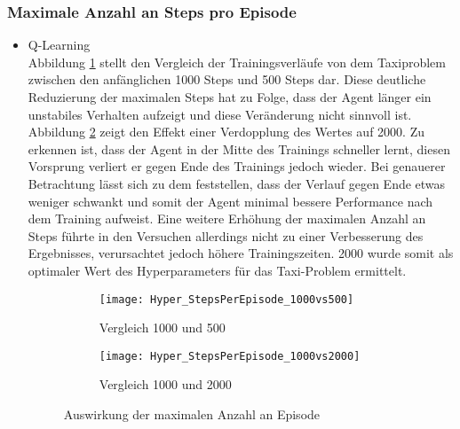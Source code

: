 \subsubsection{Maximale Anzahl an Steps pro Episode}
\begin{itemize}
    \item Q-Learning\\
    Abbildung \ref{fig:MaxStepCount_1000vs500} stellt den Vergleich der Trainingsverläufe von dem Taxiproblem zwischen den anfänglichen 1000 Steps und 500 Steps dar.
    Diese deutliche Reduzierung der maximalen Steps hat zu Folge, dass der Agent länger ein unstabiles Verhalten aufzeigt und diese Veränderung nicht sinnvoll ist.
    Abbildung \ref{fig:MaxStepCount_1000vs2000} zeigt den Effekt einer Verdopplung des Wertes auf 2000. Zu erkennen ist, dass der Agent in der Mitte des Trainings schneller lernt, diesen Vorsprung verliert er gegen Ende des Trainings jedoch wieder.
    Bei genauerer Betrachtung lässt sich zu dem feststellen, dass der Verlauf gegen Ende etwas weniger schwankt und somit der Agent minimal bessere Performance nach dem Training aufweist. 
    Eine weitere Erhöhung der maximalen Anzahl an Steps führte in den Versuchen allerdings nicht zu einer Verbesserung des Ergebnisses, verursachtet jedoch höhere Trainingszeiten.
    2000 wurde somit als optimaler Wert des Hyperparameters für das Taxi-Problem ermittelt. 

    \begin{figure}[H]
        \centering
        \begin{subfigure}{.5\textwidth}
          \centering
          \texttt{[image: Hyper\_StepsPerEpisode\_1000vs500]}
          \caption{Vergleich 1000 und 500}
          \label{fig:MaxStepCount_1000vs500}
        \end{subfigure}%
        \begin{subfigure}{.5\textwidth}
          \centering
          \texttt{[image: Hyper\_StepsPerEpisode\_1000vs2000]}
          \caption{Vergleich 1000 und 2000}
          \label{fig:MaxStepCount_1000vs2000}
        \end{subfigure}
        \caption{Auswirkung der maximalen Anzahl an Episode}
        \label{fig:MaxStepCount}
    \end{figure}


\end{itemize}
